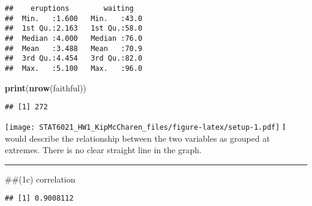 \documentclass[
]{article}
\newenvironment{Shaded}{\begin{snugshade}}{\end{snugshade}}
\newcommand{\DataTypeTok}[1]{\textcolor[rgb]{0.13,0.29,0.53}{#1}}
\newcommand{\KeywordTok}[1]{\textcolor[rgb]{0.13,0.29,0.53}{\textbf{#1}}}
\newcommand{\NormalTok}[1]{#1}
\newcommand{\OperatorTok}[1]{\textcolor[rgb]{0.81,0.36,0.00}{\textbf{#1}}}
\newcommand{\StringTok}[1]{\textcolor[rgb]{0.31,0.60,0.02}{#1}}
\begin{document}
\begin{verbatim}
##    eruptions        waiting    
##  Min.   :1.600   Min.   :43.0  
##  1st Qu.:2.163   1st Qu.:58.0  
##  Median :4.000   Median :76.0  
##  Mean   :3.488   Mean   :70.9  
##  3rd Qu.:4.454   3rd Qu.:82.0  
##  Max.   :5.100   Max.   :96.0
\end{verbatim}

\begin{Shaded}
\begin{Highlighting}[]
\KeywordTok{print}\NormalTok{(}\KeywordTok{nrow}\NormalTok{(faithful))}
\end{Highlighting}
\end{Shaded}

\begin{verbatim}
## [1] 272
\end{verbatim}

\begin{Shaded}
\end{Shaded}

\texttt{[image: STAT6021\_HW1\_KipMcCharen\_files/figure-latex/setup-1.pdf]}
I would describe the relationship between the two variables as grouped
at extremes. There is no clear straight line in the graph.

\begin{center}\rule{0.5\linewidth}{0.5pt}\end{center}

\#\#(1c) correlation

\begin{Shaded}
\end{Shaded}

\begin{verbatim}
## [1] 0.9008112
\end{verbatim}
\end{document}

